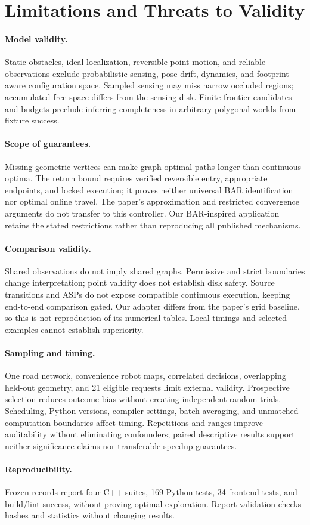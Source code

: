 \section{Limitations and Threats to Validity}
\paragraph{Model validity.} Static obstacles, ideal localization, reversible point motion, and reliable observations exclude probabilistic sensing, pose drift, dynamics, and footprint-aware configuration space. Sampled sensing may miss narrow occluded regions; accumulated free space differs from the sensing disk. Finite frontier candidates and budgets preclude inferring completeness in arbitrary polygonal worlds from fixture success.

\paragraph{Scope of guarantees.} Missing geometric vertices can make graph-optimal paths longer than continuous optima. The return bound requires verified reversible entry, appropriate endpoints, and locked execution; it proves neither universal BAR identification nor optimal online travel. The paper's approximation and restricted convergence arguments do not transfer to this controller. Our BAR-inspired application retains the stated restrictions rather than reproducing all published mechanisms.

\paragraph{Comparison validity.} Shared observations do not imply shared graphs. Permissive and strict boundaries change interpretation; point validity does not establish disk safety. Source transitions and ASPs do not expose compatible continuous execution, keeping end-to-end comparison gated. Our adapter differs from the paper's grid baseline, so this is not reproduction of its numerical tables. Local timings and selected examples cannot establish superiority.

\paragraph{Sampling and timing.} One road network, convenience robot maps, correlated decisions, overlapping held-out geometry, and 21 eligible requests limit external validity. Prospective selection reduces outcome bias without creating independent random trials. Scheduling, Python versions, compiler settings, batch averaging, and unmatched computation boundaries affect timing. Repetitions and ranges improve auditability without eliminating confounders; paired descriptive results support neither significance claims nor transferable speedup guarantees.

\paragraph{Reproducibility.} Frozen records report four C++ suites, 169 Python tests, 34 frontend tests, and build/lint success, without proving optimal exploration. Report validation checks hashes and statistics without changing results.
